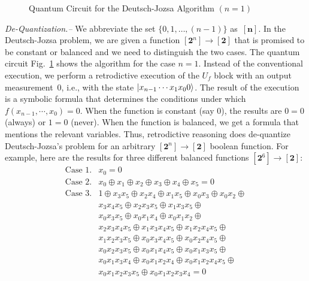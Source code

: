 \documentclass[aps,prl,twocolumn,superscriptaddress,floatfix,notitlepage]{revtex4-2}
\newcommand{\finset}[1]{[\mathbf{#1}]}
\begin{document}
\begin{figure}[t]
\centering
{}
\caption{\label{fig:deutsch}Quantum Circuit for the Deutsch-Jozsa
  Algorithm $(n=1)$}
\end{figure}

{\it De-Quantization.--} We abbreviate the set $\{ 0,1,\ldots,(n-1)\}$ as~$\finset{n}$. In the
Deutsch-Jozsa problem, we are given a function $\finset{2^\mathit{n}}
\rightarrow \finset{2}$ that is promised to be constant or balanced
and we need to distinguish the two cases. The quantum circuit
Fig.~\ref{fig:deutsch} shows the algorithm for the case $n=1$. Instead
of the conventional execution, we perform a retrodictive execution of
the $U_f$ block with an output measurement~$0$, i.e., with the state
$\ket{x_{n-1}\cdots x_1x_00}$.  The result of the execution is a
symbolic formula that determines the conditions under which
$f(x_{n-1},\cdots,x_0) = 0$. When the function is constant (say $0$), the
results are $0=0$ (always) or $1=0$ (never). When the function is
balanced, we get a formula that mentions the relevant variables. Thus, retrodictive 
reasoning does de-quantize Deutsch-Jozsa's problem for an arbitrary $\finset{2^\mathit{n}}
\rightarrow \finset{2}$ boolean function. For
example, here are the results for three different balanced
functions $\finset{2^\mathrm{6}} \rightarrow \finset{2}$:
\[\begin{array}{ll}
\textrm{Case 1.} & x_0 = 0 \\
\textrm{Case 2.} & x_0 \oplus x_1 \oplus x_2 \oplus x_3 \oplus
    x_4 \oplus x_5 = 0 \\
\textrm{Case 3.} & 1 \oplus x_3x_5 \oplus x_2x_4 \oplus x_1x_5
\oplus x_0x_3 \oplus x_0x_2 \oplus \\
& x_3x_4x_5 \oplus x_2x_3x_5 \oplus x_1x_3x_5 \oplus \\
& x_0x_3x_5 \oplus x_0x_1x_4 \oplus x_0x_1x_2 \oplus \\
& x_2x_3x_4x_5 \oplus x_1x_3x_4x_5 \oplus x_1x_2x_4x_5 \oplus \\
& x_1x_2x_3x_5 \oplus x_0x_3x_4x_5 \oplus x_0x_2x_4x_5 \oplus \\
& x_0x_2x_3x_5 \oplus x_0x_1x_4x_5 \oplus x_0x_1x_3x_5 \oplus \\
& x_0x_1x_3x_4 \oplus x_0x_1x_2x_4 \oplus x_0x_1x_2x_4x_5 \oplus \\
& x_0x_1x_2x_3x_5 \oplus x_0x_1x_2x_3x_4 = 0
\end{array}\]
\end{document}
